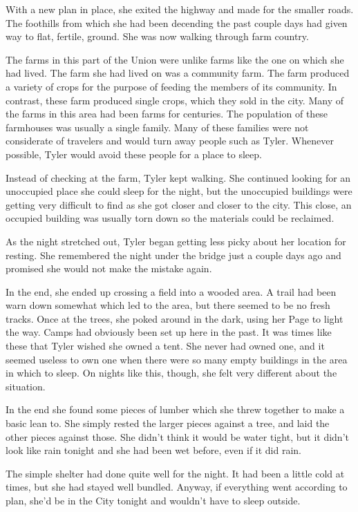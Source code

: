 \documentclass[courier]{sffms}
\begin{document}
With a new plan in place, she exited the highway and
made for the smaller roads. The foothills from which
she had been decending the past couple days had
given way to flat, fertile, ground. She was now 
walking through farm country.

The farms in this part of the Union were unlike farms
like the one on which she had lived. The farm she had
lived on was a community farm. The farm produced
a variety of crops for the purpose of feeding the 
members of its community. In contrast, these farm
produced single crops, which they sold in the city.
Many of the farms in this area had been farms for 
centuries. The population of these farmhouses was
usually a single family. Many of these families were
not considerate of travelers and would turn away people
such as Tyler. Whenever possible, Tyler would avoid
these people for a place to sleep.

Instead of checking at the farm, Tyler kept walking.
She continued looking for an unoccupied place
she could sleep for the night, but the unoccupied
buildings were getting very difficult to find as she
got closer and closer to the city. This close, an
occupied building was usually torn down so the
materials could be reclaimed.

As the night stretched out, Tyler began getting less
picky about her location for resting. She remembered
the night under the bridge just a couple days ago
and promised she would not make the mistake again.

In the end, she ended up crossing a field into a wooded
area. A trail had been warn down somewhat which led
to the area, but there seemed to be no fresh tracks.
Once at the trees, she poked around in the dark, using
her Page to
light the way. Camps had obviously been set up here in
the past. It was times like these that Tyler wished she
owned a tent. She never had owned one, and it seemed
useless to own one when there were so many empty
buildings in the area in which to sleep. On nights
like this, though, she felt very different about the situation.

In the end she found some pieces of lumber which she
threw together to make a basic lean to. She simply
rested the larger pieces against a tree, and laid the other
pieces against those. She didn't think it would be water
tight, but it didn't look like rain tonight and she had been wet
before, even if it did rain.

The simple shelter had done quite well for the night. It had
been a little cold at times, but she had stayed well bundled.
Anyway, if everything went according to plan, she'd be in
the City tonight and wouldn't have to sleep outside.
\end{document}
